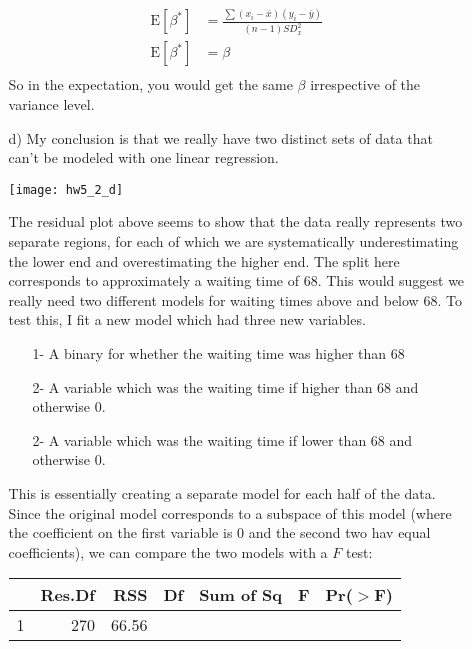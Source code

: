 \documentclass[11pt]{article}
\newcommand{\E}{\mathrm{E}}
\theoremstyle{definition}
\begin{document}
\begin{itemize}
\begin{itemize}
\begin{align*}
                    \E[\beta^*] &= \frac{\sum(x_i-\bar x)(y_i-\bar y)}{(n-1)SD_x^2} \\
                    \E[\beta^*] &= \beta \\
                \end{align*}
                So in the expectation, you would get the same $\beta$ irrespective of the variance level. \\
            \item[d)] 
                My conclusion is that we really have two distinct sets of data that can't be modeled with one linear regression.
                \begin{center}
                    \texttt{[image: hw5\_2\_d]}
                \end{center}
                The residual plot above seems to show that the data really represents two separate regions, for each of which we are systematically underestimating the lower end and overestimating the higher end. The split here corresponds to approximately a waiting time of $68$. This would suggest we really need two different models for waiting times above and below $68$. To test this, I fit a new model which had three new variables.
                \begin{itemize}
                    \item[1-] A binary for whether the waiting time was higher than $68$
                    \item[2-] A variable which was the waiting time if higher than $68$ and otherwise $0$.
                    \item[2-] A variable which was the waiting time if lower than $68$ and otherwise $0$.
                \end{itemize}
                This is essentially creating a separate model for each half of the data. Since the original model corresponds to a subspace of this model (where the coefficient on the first variable is $0$ and the second two hav equal coefficients), we can compare the two models with a $F$ test: \\
                \begin{table}[ht]
                \centering
                \begin{tabular}{lrrrrrr}
                    \hline
                       & Res.Df & RSS & Df & Sum of Sq & F & Pr($>$F) \\ 
                        \hline
                        1 & 270 & 66.56 &  &  &  &  \\ 

\end{tabular}
\end{table}
\end{itemize}
\end{itemize}
\end{document}
